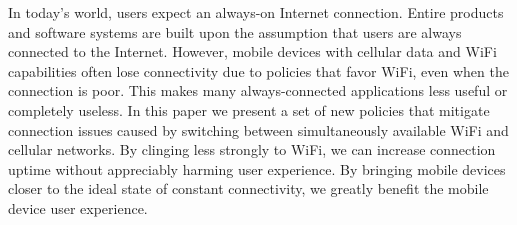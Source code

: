 
In today's world, users expect an always-on Internet connection. Entire products and software systems are built upon the assumption that users are always connected to the Internet. However, mobile devices with cellular data and WiFi capabilities often lose connectivity due to policies that favor WiFi, even when the connection is poor. This makes many always-connected applications less useful or completely useless. In this paper we present a set of new policies that mitigate connection issues caused by switching between simultaneously available WiFi and cellular networks. By clinging less strongly to WiFi, we can increase connection uptime without appreciably harming user experience. By bringing mobile devices closer to the ideal state of constant connectivity, we greatly benefit the mobile device user experience.

